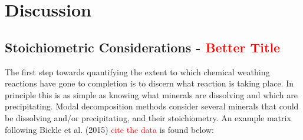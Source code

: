 

\section{Discussion}













\subsection{Stoichiometric Considerations - \textcolor{red}{Better Title}}

The first step towards quantifying the extent to which chemical weathing reactions have gone to completion is to discern what reaction is taking place. In principle this is as simple as knowing what minerals are dissolving and which are precipitating. Modal decomposition methods consider several minerals that could be dissolving and/or precipitating, and their stoichiometry. An example matrix following Bickle et al. (2015) \textcolor{red}{cite the data} is found below:


